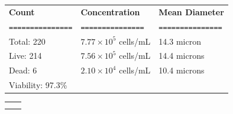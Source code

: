 \documentclass[UTF8,10pt,a4paper,fontset=fandol]{ctexart}
\renewcommand{\arraystretch}{1.15}
\newcommand{\fieldvalue}[1]{#1}
\begin{document}
\renewcommand{\arraystretch}{1.15}
\begin{tabularx}{\textwidth}{@{}>{\RaggedRight\arraybackslash}X
                                >{\RaggedRight\arraybackslash}X
                                >{\RaggedRight\arraybackslash}X@{}}
\textbf{Count} & \textbf{Concentration} & \textbf{Mean Diameter} \\
\texttt{===============} & \texttt{===============} & \texttt{===============} \\

Total:
\fieldvalue{220}
&
\fieldvalue{$7.77\times 10^{5}$ cells/mL}
&
\fieldvalue{14.3 micron}
\\

Live:
\fieldvalue{214}
&
\fieldvalue{$7.56\times 10^{5}$ cells/mL}
&
\fieldvalue{14.4 microns}
\\

Dead:
\fieldvalue{6}
&
\fieldvalue{$2.10\times 10^{4}$ cells/mL}
&
\fieldvalue{10.4 microns}
\\

Viability:
\fieldvalue{97.3\%}
&
&
\end{tabularx}

\vspace{2em}

\begin{center}
\begin{tabular}{cc}
\fbox{\rule{0pt}{0.22\textheight}\rule{0.42\textwidth}{0pt}}
&
\fbox{\rule{0pt}{0.22\textheight}\rule{0.42\textwidth}{0pt}}
\\[1em]
\fbox{\rule{0pt}{0.22\textheight}\rule{0.42\textwidth}{0pt}}
&
\fbox{\rule{0pt}{0.22\textheight}\rule{0.42\textwidth}{0pt}}
\end{tabular}
\end{center}

\vfill
\end{document}
